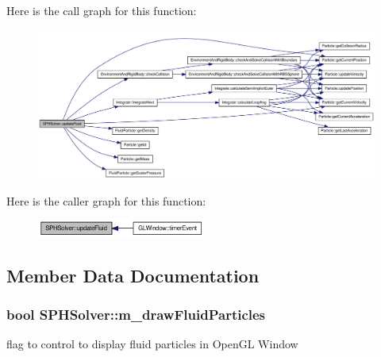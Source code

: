 Here is the call graph for this function:\nopagebreak
\begin{figure}[H]
\begin{center}
\leavevmode
\includegraphics[width=420pt]{class_s_p_h_solver_a38ef1e0f18763b28118e3be3a8ba7d08_cgraph}
\end{center}
\end{figure}




Here is the caller graph for this function:\nopagebreak
\begin{figure}[H]
\begin{center}
\leavevmode
\includegraphics[width=157pt]{class_s_p_h_solver_a38ef1e0f18763b28118e3be3a8ba7d08_icgraph}
\end{center}
\end{figure}




\subsection{Member Data Documentation}
\hypertarget{class_s_p_h_solver_a67a0ab46b9a3105400546a758ac6f2d1}{
\subsubsection[{m\_\-drawFluidParticles}]{\setlength{\rightskip}{0pt plus 5cm}bool {\bf SPHSolver::m\_\-drawFluidParticles}}}
\label{class_s_p_h_solver_a67a0ab46b9a3105400546a758ac6f2d1}


flag to control to display fluid particles in OpenGL Window 



